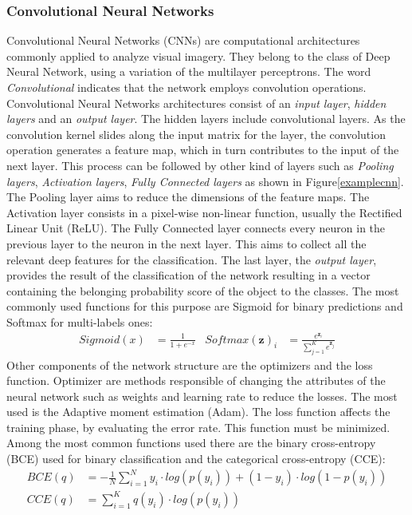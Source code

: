 \documentclass{standalone}
\begin{document}
\subsubsection{Convolutional Neural Networks} 
Convolutional Neural Networks (CNNs) are computational architectures commonly applied to analyze visual imagery.
They belong to the class of Deep Neural Network, using a variation of the multilayer perceptrons.
The word \textit{Convolutional} indicates that the network employs convolution operations.
Convolutional Neural Networks architectures consist of an \textit{input layer}, \textit{hidden layers} and an \textit{output layer}.
The hidden layers include convolutional layers.
As the convolution kernel slides along the input matrix for the layer, the convolution operation generates a feature map, which in turn contributes to the input of the next layer\cite{CNN}.
This process can be followed by other kind of layers such as \textit{Pooling layers},  \textit{Activation layers}, \textit{Fully Connected layers} as shown in Figure\ref{examplecnn}.
The Pooling layer aims to reduce the dimensions of the feature maps. 
The Activation layer consists in a pixel-wise non-linear function, usually the Rectified Linear Unit (ReLU).
The Fully Connected layer connects every neuron in the previous layer to the neuron in the next layer. 
This aims to collect all the relevant deep features for the classification.
The last layer, the \textit{output layer}, provides the result of the classification of the network resulting in a vector containing the belonging probability score of the object to the classes.
The most commonly used functions for this purpose are Sigmoid for binary predictions and Softmax for multi-labels ones:
\begin{align}
    Sigmoid(x) & = \frac{1}{1 + e^{-x}}  & Softmax(\mathbf{z})_i & = \frac{e^{\mathbf{z}_i}}{ \sum_{j=1}^{K} e^{\mathbf{z}_j}}
\end{align}
Other components of the network structure are the optimizers and the loss function. 
Optimizer are methods responsible of changing the attributes of the neural network such as weights and learning rate to reduce the losses. 
The most used is the Adaptive moment estimation (Adam). 
The loss function affects the training phase, by evaluating the error rate.
This function must be minimized. 
Among the most common functions used there are the binary cross-entropy (BCE) used for binary classification and the categorical cross-entropy (CCE):
\begin{align}
    BCE(q) &= - \frac{1}{N} \sum_{i = 1}^{N} y_i \cdot log(p(y_i)) + (1 - y_i) \cdot log(1 - p(y_i)) \\ 
    CCE(q) &=  \sum_{i = 1}^{K} q(y_i) \cdot log(p(y_i))
\end{align}
\end{document}
